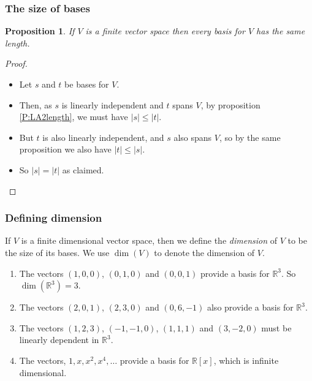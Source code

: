 \documentclass[handout]{beamer}
\newtheorem{proposition}[theorem]{Proposition}
\newcommand{\bR}{\mathbb{R}}
\begin{document}
\begin{frame}
\frametitle{The size of bases}
\begin{proposition}\label{P:LA2basis}
If $V$ is a finite vector space then every basis for $V$ has the same length.
\end{proposition}
\begin{proof}
\begin{itemize}
\item Let $s$ and $t$ be bases for $V$. 
\vspace{0.5cm}
\item Then, as $s$ is linearly independent and $t$ spans $V$, by proposition \ref{P:LA2length}, we must have $|s|\leq |t|$. 
\vspace{0.5cm}
\item But $t$ is also linearly independent, and $s$ also spans $V$, so by the same proposition we also have $|t|\leq |s|$. 
\vspace{0.5cm}
\item So $|s|=|t|$ as claimed.
\end{itemize}
\end{proof}
\end{frame}

\begin{frame}
\frametitle{Defining dimension}
\begin{definition}
If $V$ is a finite dimensional vector space, then we define the \emph{dimension} of $V$ to be the size of its bases. We use $\dim(V)$ to denote the dimension of $V$.
\end{definition}

\begin{example}
\begin{enumerate}
\item The vectors $(1,0,0)$, $(0,1,0)$ and $(0,0,1)$ provide a basis for $\bR^3$. So $\dim(\bR^3) = 3$.
\item The vectors $(2,0,1)$, $(2,3,0)$ and $(0,6,-1)$ also provide a basis for $\bR^3$.
\item The vectors $(1,2,3)$, $(-1,-1,0)$, $(1,1,1)$ and $(3,-2,0)$ must be linearly dependent in $\bR^3$.
\item The vectors, $1,x,x^2,x^4,\ldots$ provide a basis for $\bR[x]$, which is infinite dimensional.  
\end{enumerate}
\end{example}
\end{frame}
\end{document}

